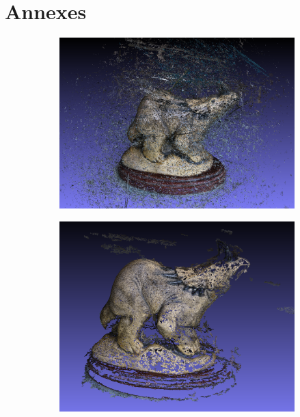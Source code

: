 \appendix
{}
\chapter*{Annexes}

\begin{figure}[ht]
    \centering
    \begin{subfigure}{0.37\textwidth}
        \includegraphics[width=\linewidth]{datas/state_of_the_art/opensfm_result_dino.png}
        \caption{}
    \end{subfigure}
    \begin{subfigure}{0.37\textwidth}
        \includegraphics[width=\linewidth]{datas/state_of_the_art/visualsfm_result_dino.png}
        \caption{}
    \end{subfigure}


\end{figure}
